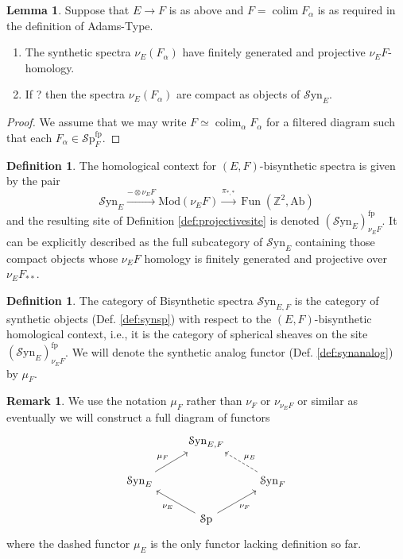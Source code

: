 \documentclass[10pt]{amsart}
\theoremstyle{definition}
\numberwithin{figure}{section}
\numberwithin{equation}{section}
\newtheorem{lemma}[figure]{Lemma}
\newtheorem{definition}[figure]{Definition}
\newtheorem{remark}[figure]{Remark}
\theoremstyle{cited}
\newcommand{\bZ}{\mathbb{Z}}
\newcommand{\Fun}{\operatorname{Fun}}
\newcommand{\colim}{\operatorname{colim}}
\newcommand{\Ab}{\mathrm{Ab}}
\newcommand{\Sp}{{\mathcal{S}\mathrm{p}}}
\newcommand{\Mod}{\mathrm{Mod}}
\newcommand{\fp}{\mathrm{fp}}
\newcommand{\Syn}{\mathcal{S}\mathrm{yn}}
\begin{document}
\begin{lemma}
  Suppose that $E\to F$ is as above and $F=\colim F_\alpha$ is as required in the definition of Adams-Type.
  \begin{enumerate}
    \item The synthetic spectra $\nu_E(F_\alpha)$ have finitely generated and projective $\nu_E F$-homology.
    \item If ? then the spectra $\nu_E(F_\alpha)$ are compact as objects of $\Syn_E$.
  \end{enumerate}
\end{lemma}

\begin{proof}
  We assume that we may write $F\simeq \colim_\alpha F_\alpha$ for a filtered diagram such that each $F_\alpha \in \Sp^\fp_F$.
\end{proof}

\begin{definition}
  The homological context for $(E,F)$-bisynthetic spectra is given by the pair
  \[
  \Syn_{E} \xrightarrow{-\otimes \nu_E F} \Mod(\nu_E F) \xrightarrow{\pi_{*,*}} \Fun(\bZ^2, \Ab)
  \]
  and the resulting site of Definition \ref{def:projectivesite} is denoted $(\Syn_E)_{\nu_E F}^\fp$. It can be explicitly described as the full subcategory of $\Syn_E$ containing those compact objects whose $\nu_E F$ homology is finitely generated and projective over $\nu_E F_{**}$.
\end{definition}

\begin{definition}
  The category of Bisynthetic spectra $\Syn_{E,F}$ is the category of synthetic objects (Def. \ref{def:synsp}) with respect to the $(E,F)$-bisynthetic homological context, i.e., it is the category of spherical sheaves on the site $(\Syn_E)_{\nu_E F}^\fp$. We will denote the synthetic analog functor (Def. \ref{def:synanalog}) by $\mu_F$.
\end{definition}

\begin{remark}
  We use the notation $\mu_F$ rather than $\nu_F$ or $\nu_{\nu_E F}$ or similar as eventually we will construct a full diagram of functors
\[\begin{tikzcd}
	& {\Syn_{E,F}} \\
	{\Syn_E} && {\Syn_F} \\
	& \Sp
	\arrow["{\mu_F}", from=2-1, to=1-2]
	\arrow["{\mu_E}"', dashed, from=2-3, to=1-2]
	\arrow["{\nu_E}", from=3-2, to=2-1]
	\arrow["{\nu_F}"', from=3-2, to=2-3]
\end{tikzcd}\]
where the dashed functor $\mu_E$ is the only functor lacking definition so far.
\end{remark}
\end{document}
